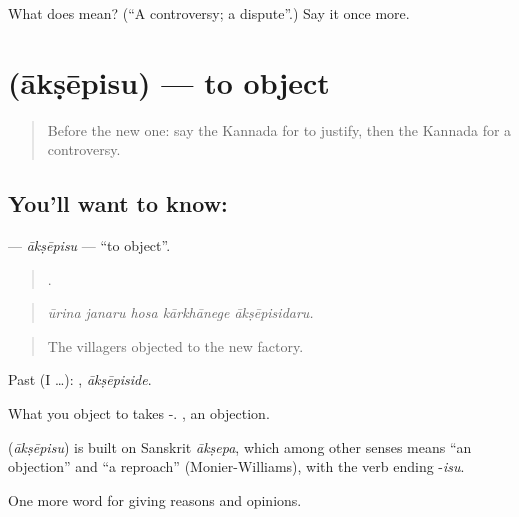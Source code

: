 \begin{tcolorbox}[breakable,colback=teal!4,colframe=teal!35!black,title={Before you move on}]
What does  mean? (\textquotedblleft{}A controversy; a dispute\textquotedblright{}.) Say it once more.
\end{tcolorbox}
\section[\texorpdfstring{\kn{ಆಕ್ಷೇಪಿಸು} (ākṣēpisu)}{ಆಕ್ಷೇಪಿಸು (ākṣēpisu)}]{ (ākṣēpisu) — to object}

\label{lesson:KA-C377-aksepisu}



\begin{quote}
Before the new one: say the Kannada for to justify, then the Kannada for a controversy.
\end{quote}

\subsection*{You'll want to know: }
\textbf{} — \emph{ākṣēpisu} — \textquotedblleft{}to object\textquotedblright{}.

\begin{quote}
    .
\end{quote}

\begin{quote}
\emph{ūrina janaru hosa kārkhānege ākṣēpisidaru.}
\end{quote}

\begin{quote}
The villagers objected to the new factory.
\end{quote}

Past (I …): , \emph{ākṣēpiside}.

What you object to takes -. , an objection.

\begin{cousinweb}
\textbf{} (\emph{ākṣēpisu}) is built on Sanskrit \emph{ākṣepa}, which among other senses means \textquotedblleft{}an objection\textquotedblright{} and \textquotedblleft{}a reproach\textquotedblright{} (Monier-Williams), with the verb ending -\emph{isu}.
\end{cousinweb}

\begin{grammarlens}[title={What you've built}]
One more word for giving reasons and opinions.
\end{grammarlens}

